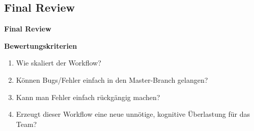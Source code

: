 \subsection{Final Review}\label{subsec:final-review}
\begin{frame}[c]
    \slidehead
    \centering
    \Large
    \textbf{Final Review}
\end{frame}

\begin{frame}[c]
    \slidehead
    \large
    \textbf{Bewertungskriterien}
    \normalsize
    \begin{enumerate}
        \item<2-> Wie skaliert der Workflow? 
        \item<4-> Können Bugs/Fehler einfach in den Master-Branch gelangen? 
        \item<6-> Kann man Fehler einfach rückgängig machen? 
        \item<8-> Erzeugt dieser Workflow eine neue unnötige, kognitive Überlastung für das Team? 
    \end{enumerate}
\end{frame}
